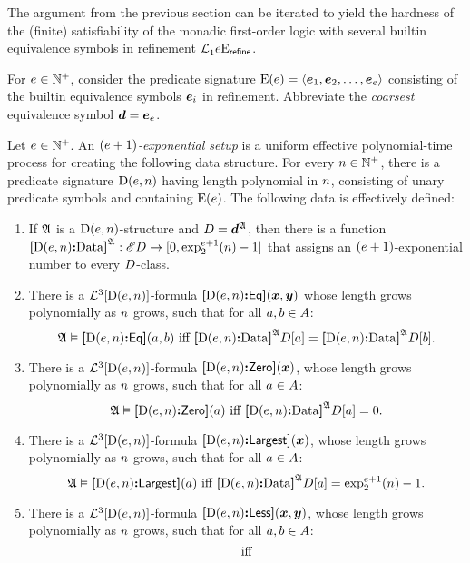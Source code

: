 The argument from the previous section can be iterated to yield the hardness of
the (finite) satisfiability of the monadic first-order logic with several
builtin equivalence symbols in refinement $\Lvp\Fo\nonv1\Eea\sze\agrefine$.

For $\sze \in \pNats$, consider the predicate signature $\ES(\sze) =
\seq{\see1,\see2,\dots,\see\sze}$ consisting of the builtin equivalence
symbols $\see\ii$ in refinement. Abbreviate the \emph{coarsest} equivalence 
symbol $\sd = \see\sze$.
\begin{definition}
Let $\sze \in \pNats$. An \emph{$(\sze+1)$-exponential setup} is a uniform
effective polynomial-time process for creating the following data structure.
For every $\nn \in \pNats$, there is a predicate signature $\DS(\sze,\nn)$
having length polynomial in $\nn$, consisting of unary predicate symbols and
containing $\ES(\sze)$. The following data is effectively defined:
\begin{enumerate}
  \item If $\StrA$ is a $\DS(\sze,\nn)$-structure and $\relD = \at\StrA\sd$,
  then there is a function 
  $\Data{\DS(\sze,\nn)}\StrA : \Ecl\relD \to [0, \tetr{\sze+1}2\nn-1]$ that
  assigns an $(\sze+1)$-exponential number to every $\relD$-class.
  \item There is a $\vFoF3{\DS(\sze,\nn)}$-formula
  $\fEq{\DS(\sze,\nn)}(\xx,\yy)$ whose length grows polynomially as $\nn$ grows,
  such that for all $\ea,\eb \in \domA$:
  \[
    \miff{
      \StrA \vDash \fEq{\DS(\sze,\nn)}(\ea,\eb)}{
      \Data{\DS(\sze,\nn)}\StrA\relD[\ea] = \Data{\DS(\sze,\nn)}\StrA\relD[\eb]}.
  \]
  \item There is a $\vFoF3{\DS(\sze,\nn)}$-formula $\fZero{\DS(\sze,\nn)}(\xx)$,
  whose length grows polynomially as $\nn$ grows, such that for all
  $\ea \in \domA$:
  \[
    \miff{
      \StrA \vDash \fZero{\DS(\sze,\nn)}(\ea)}{
      \Data{\DS(\sze,\nn)}\StrA\relD[\ea] = 0}.
  \]
  \item There is a $\vFoF3{\DS(\sze,\nn)}$-formula $\fMax{\DS(\sze,\nn)}(\xx)$,
  whose length grows polynomially as $\nn$ grows, such that for all
  $\ea \in \domA$:
  \[
    \miff{
      \StrA \vDash \fMax{\DS(\sze,\nn)}(\ea)}{
      \Data{\DS(\sze,\nn)}\StrA\relD[\ea] = \tetr{\sze+1}2\nn - 1}.
  \]
  \item There is a $\vFoF3{\DS(\sze,\nn)}$-formula
  $\fLess{\DS(\sze,\nn)}(\xx,\yy)$, whose length grows polynomially as $\nn$
  grows, such that for all $\ea, \eb \in \domA$:
  \[
    \miff{
}\]
\end{enumerate}
\end{definition}
